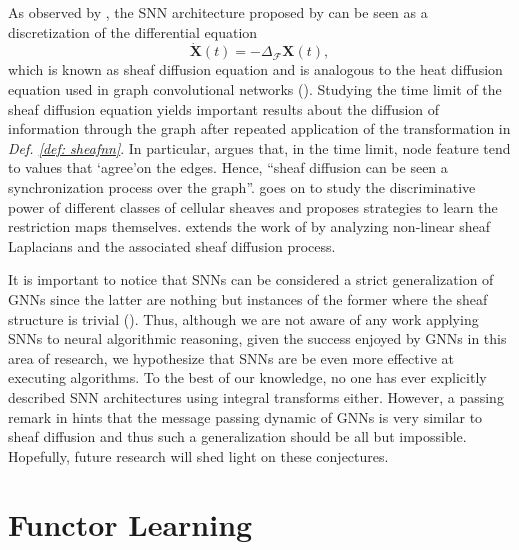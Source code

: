 \documentclass[11pt,a4paper,openright,twoside]{report}
\theoremstyle{plain}
\theoremstyle{definition}
\newcommand\dblquote[1]{\textquotedblleft #1\textquotedblright}
\begin{document}
As observed by \cite{bodnar2022neural}, the SNN architecture proposed by \cite{hansen2020sheaf} can be seen as a discretization of the differential equation 
\[\dot{\mathbf{X}}(t) = -\Delta_{\mathcal{F}}\mathbf{X}(t),\]
which is known as sheaf diffusion equation and is analogous to the heat diffusion equation used in graph convolutional networks (\cite{bodnar2022neural}). Studying the time limit of the sheaf diffusion equation yields important results about the diffusion of information through the graph after repeated application of the transformation in \textit{Def. \ref{def: sheafnn}}. In particular, \cite{bodnar2022neural} argues that, in the time limit, node feature tend to values that \lq agree\rq on the edges. Hence, \dblquote{sheaf diffusion can be seen a synchronization process over the graph}. \cite{bodnar2022neural} goes on to study the discriminative power of different classes of cellular sheaves and proposes strategies to learn the restriction maps themselves. \cite{zaghen2024nonlinear} extends the work of \cite{bodnar2022neural} by analyzing non-linear sheaf Laplacians and the associated sheaf diffusion process.

It is important to notice that SNNs can be considered a strict generalization of GNNs  since the latter are nothing but instances of the former where the sheaf structure is trivial (\cite{bodnar2022neural}). Thus, although we are not aware of any work applying SNNs to neural algorithmic reasoning, given the success enjoyed by GNNs in this area of research, we hypothesize that SNNs are be even more effective at executing algorithms. 
To the best of our knowledge, no one has ever explicitly described SNN architectures using integral transforms either. However, a passing remark in \cite{dudzik2024asynchronous} hints that the message passing dynamic of GNNs is very similar to sheaf diffusion and thus such a generalization should be all but impossible. Hopefully, future research will shed light on these conjectures.

\clearpage{\pagestyle{empty}\cleardoublepage}


\chapter{Functor Learning}
\lhead[\fancyplain{}{\bfseries\thepage}]{\fancyplain{}{\bfseries\rightmark}}
\end{document}
